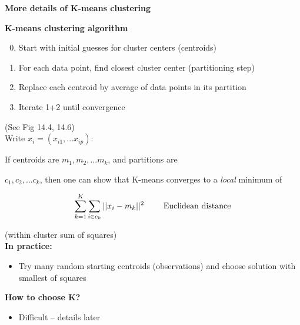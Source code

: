 \documentclass[letterpaper]{seminar}
\begin{document}





\newcommand{\gem}{}

\def\RED{}

\def\GREEN{}

\thispagestyle{empty}

\begin{slide}
\centerline{\bf More details  of K-means clustering}

\end{slide}
\begin{slide}

{\bf K-means clustering algorithm}

\begin{enumerate}

\setcounter{enumi}{-1}

\item Start with initial guesses for cluster centers (centroids)

\item For each data point, find closest cluster center (partitioning step)

\item Replace each centroid by average of data points in its partition

\item Iterate 1+2 until convergence

\end{enumerate}

(See Fig 14.4, 14.6) \\

Write $x_i = (x_{i1}, ... x_{ip})$:

If centroids are $m_1, m_2, ... m_k$, and partitions are

$c_1, c_2, ... c_k$, then one can show that K-means converges to a {\it local} minimum of

\[
\sum^K_{k=1} \sum_{i\in c_k} || x_i - m_k ||^2 \ \ \ \ \ \ \ \rm Euclidean \ distance
\]

(within cluster sum of squares) \\

{\bf In practice:}

\begin{itemize}

\item Try many random starting centroids (observations) and choose solution with smallest of squares

\end{itemize}

{\bf How to choose K?}

\begin{itemize}

\item Difficult -- details later

\end{itemize}

\end{slide}
\end{document}

